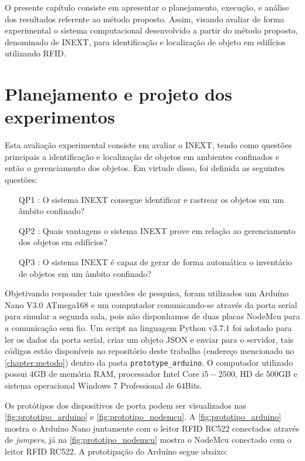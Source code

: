 \label{chapter:resultados}

O presente capítulo consiste em apresentar o planejamento, execução, e  análise dos resultados referente ao método proposto. Assim,  visando avaliar de forma experimental o sistema computacional desenvolvido a partir do método proposto, denominado de INEXT, para identificação e localização de objeto em edifícios utilizando RFID.

\section{Planejamento e projeto dos experimentos}

Esta avaliação experimental consiste em avaliar o INEXT, tendo como questões principais a identificação e localização de objetos em ambientes confinados e então o gerenciamento dos objetos. Em virtude disso, foi definida as seguintes questões:

\begin{itemize}

    \item[QP1]: O sistema INEXT consegue identificar e rastrear os objetos em um âmbito confinado?
    \item[QP2]: Quais vantagens o sistema INEXT prove em relação ao gerenciamento dos objetos em edifícios?
    \item[QP3]: O sistema INEXT é capaz de gerar de forma automática o inventário de objetos em um âmbito confinado?
    
\end{itemize}

\par 
Objetivando responder tais questões de pesquisa, foram utilizados um Arduíno Nano V$3.0$ ATmega168 e um computador comunicando-se através da porta serial para simular a segunda sala, pois não disponhamos de duas placas NodeMcu para a comunicação sem fio. Um script na linguagem Python v$3.7.1$ foi adotado para ler os dados da porta serial, criar um objeto JSON e enviar para o servidor, tais códigos estão disponíveis no repositório deste trabalho (endereço mencionado no \autoref{chapter:metodo}) dentro da pasta \texttt{prototype\_arduino}. O computador utilizado possui $4$GB de memória RAM, processador Intel Core i$5-2500$, HD de $500$GB e sistema operacional Windows $7$ Professional de $64$Bits. 

Os protótipos dos dispositivos de porta podem ser visualizados nas \autoref{fig:prototipo_arduino} e \autoref{fig:prototipo_nodemcu}. A \autoref{fig:prototipo_arduino} mostra o Arduíno Nano juntamente com o leitor RFID RC522 conectados através de \textit{jumpers}, já na \autoref{fig:prototipo_nodemcu} mostra o NodeMcu conectado com o leitor RFID RC522. A prototipação do Arduíno segue abaixo:

